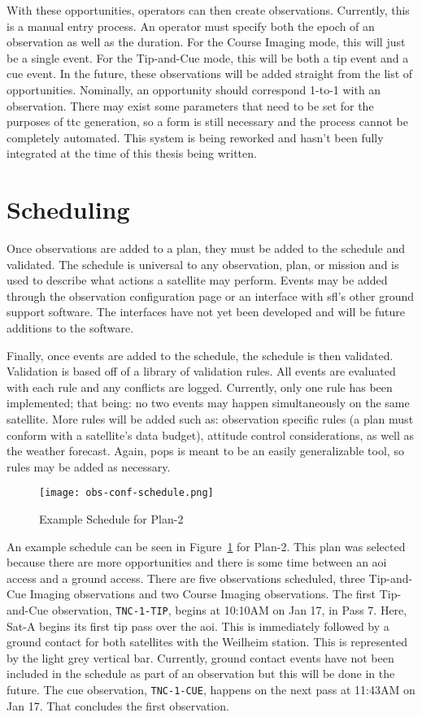 With these opportunities, operators can then create observations. Currently,
this is a manual entry process. An operator must specify both the epoch of an
observation as well as the duration. For the Course Imaging mode, this will
just be a single event. For the Tip-and-Cue mode, this will be both a tip event
and a cue event. In the future, these observations will be added straight from
the list of opportunities. Nominally, an opportunity should correspond 1-to-1
with an observation. There may exist some parameters that need to be set for
the purposes of \gls{ttc} generation, so a form is still necessary and the
process cannot be completely automated. This system is being reworked and
hasn't been fully integrated at the time of this thesis being written.


\section{Scheduling}


Once observations are added to a plan, they must be added to the schedule and
validated. The schedule is universal to any observation, plan, or mission and
is used to describe what actions a satellite may perform. Events may be added
through the observation configuration page or an interface with \gls{sfl}’s
other ground support software. The interfaces have not yet been developed and
will be future additions to the software.

Finally, once events are added to the schedule, the schedule is then validated.
Validation is based off of a library of validation rules. All events are
evaluated with each rule and any conflicts are logged. Currently, only one rule
has been implemented; that being: no two events may happen simultaneously on
the same satellite. More rules will be added such as: observation specific
rules (a plan must conform with a satellite’s data budget), attitude control
considerations, as well as the weather forecast. Again, \gls{pops} is meant to
be an easily generalizable tool, so rules may be added as necessary.


\begin{figure}[h]
    \centering
    \texttt{[image: obs-conf-schedule.png]} 
    \caption{Example Schedule for Plan-2}
    \label{fig:obs-conf-schedule}
\end{figure}

An example schedule can be seen in Figure~\ref{fig:obs-conf-schedule} for
Plan-2. This plan was selected because there are more opportunities and there is
some time between an \gls{aoi} access and a ground access. There are five
observations scheduled, three Tip-and-Cue Imaging observations and two Course
Imaging observations. The first Tip-and-Cue observation, \texttt{TNC-1-TIP},
begins at 10:10AM on Jan 17, in Pass 7. Here, Sat-A begins its first tip pass
over the \gls{aoi}.  This is immediately followed by a ground contact for both
satellites with the Weilheim station. This is represented by the light grey
vertical bar.  Currently, ground contact events have not been included in the
schedule as part of an observation but this will be done in the future.  The
cue observation, \texttt{TNC-1-CUE}, happens on the next pass at 11:43AM on Jan
17.  That concludes the first observation.


